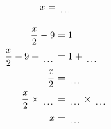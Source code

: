 \documentclass[12pt]{article}
\newcounter{minipagecount}
\begin{document}
\begin{multicols}{2}
\begin{minipage}[t]{0.45\textwidth}
\begin{align*}
        x &= \dotuline{\hspace{5mm}}\\
    \end{align*}
\end{minipage} %
\noindent{(\theminipagecount)}\hspace{0.1mm} %
\begin{minipage}[t]{0.45\textwidth} %
    \vspace{-26pt}  %
    \raggedright %
    \begin{align*} %
        \frac{x}{2} - 9 &= 1\\
        \frac{x}{2} - 9 + \dotuline{\hspace{5mm}} &= 1 + \dotuline{\hspace{5mm}}\\
        \frac{x}{2} &= \dotuline{\hspace{5mm}}\\
        \frac{x}{2} \times\dotuline{\hspace{5mm}} &= \dotuline{\hspace{5mm}} \times\dotuline{\hspace{5mm}}\\
        x &= \dotuline{\hspace{5mm}}\\
    \end{align*}
\end{minipage} %
\noindent{(\theminipagecount)}\hspace{0.1mm} %
\begin{minipage}[t]{0.45\textwidth} %
    \vspace{-26pt}  %

\end{minipage}
\end{multicols}
\end{document}
